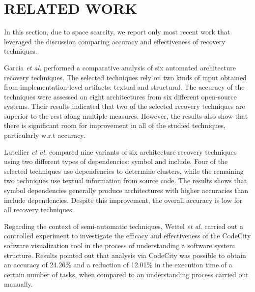\section{RELATED WORK}\label{sec:related}

 In this section, due to space scarcity, we report only most recent work that leveraged the discussion comparing accuracy and effectiveness of recovery techniques.

Garcia \textit{et al.} \cite{Garcia:ASE2013} performed a comparative analysis of six automated architecture recovery techniques. The selected techniques rely on two kinds of input obtained from im\-ple\-mentation-level artifacts: textual and structural. The accuracy of the techniques were assessed on eight architectures from six different open-source systems. Their results indicated that two of the selected recovery techniques are superior to the rest along multiple measures. However, the results also show that there is significant room for improvement in all of the studied techniques, particularly w.r.t accuracy.

Lutellier \textit{et al.} \cite{Lutellier_2015} compared nine variants of six architecture recovery techniques using two different types of dependencies: symbol and include. Four of the selected techniques use dependencies to determine clusters, while the remaining two techniques use textual information from source code. The results shows that symbol dependencies generally produce architectures with higher accuracies than include dependencies. Despite this improvement, the overall accuracy is low for all recovery techniques.

Regarding the context of semi-automatic techniques, Wettel \textit{et al.} \cite{wettel_software_2011} carried out a controlled experiment to investigate the efficacy and effectiveness of the CodeCity software visualization tool in the process of understanding a software system structure. Results pointed out that analysis via CodeCity was possible to obtain an accuracy of 24.26\% and a reduction of 12.01\% in the execution time of a certain number of tasks, when compared to an understanding process carried out manually. %